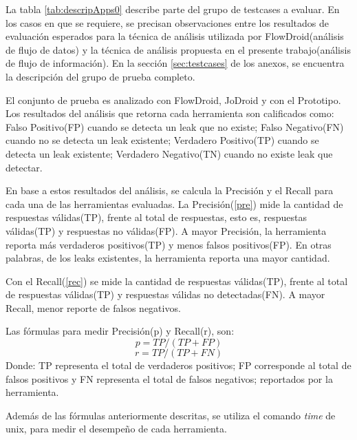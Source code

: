 La tabla \ref{tab:descripApps0} describe parte del grupo de testcases a
evaluar. En los casos en que se requiere, se precisan observaciones entre los
resultados de evaluación esperados para la técnica de análisis utilizada por
FlowDroid(análisis de flujo de datos) y la técnica de análisis propuesta en el
presente trabajo(análisis de flujo de información).
En la sección \ref{sec:testcases} de los anexos, se encuentra la
descripción del grupo de prueba completo.

El conjunto de prueba es analizado con FlowDroid, JoDroid y con el Prototipo. Los
resultados del análisis que retorna cada herramienta son calificados como:
Falso Positivo(FP) cuando se detecta un leak que no existe; Falso Negativo(FN)
cuando no se detecta un leak existente; Verdadero Positivo(TP) cuando se detecta
un leak existente; Verdadero Negativo(TN) cuando no existe leak que
detectar.

En base a estos resultados del análisis, se calcula la Precisión y el Recall
para cada una de las herramientas evaluadas. 
La Precisión(\ref{pre}) mide la cantidad de respuestas válidas(TP), frente al
total de respuestas, esto es, respuestas válidas(TP) y respuestas no válidas(FP).
A mayor Precisión, la herramienta reporta más verdaderos positivos(TP) y menos
falsos positivos(FP). En otras palabras, de los leaks existentes, la
herramienta reporta una mayor cantidad.

Con el Recall(\ref{rec}) se mide la cantidad de respuestas válidas(TP), frente
al total de respuestas válidas(TP) y respuestas válidas no detectadas(FN). A
mayor Recall, menor reporte de falsos negativos.\newline

Las fórmulas para medir Precisión(p) y Recall(r), son:
\begin{equation}
\label{pre}
	p = TP/(TP +FP) 
\end{equation}
\begin{equation}
\label{rec}
	r = TP/(TP+FN)
\end{equation}
Donde: \newline
TP representa el total de verdaderos positivos; FP corresponde al total de
falsos positivos y  FN representa el total de falsos
negativos; reportados por la herramienta.

Además de las fórmulas anteriormente descritas, se utiliza el comando
\textit{time}\cite{time-man} de unix, para medir el desempeño de cada
herramienta.

